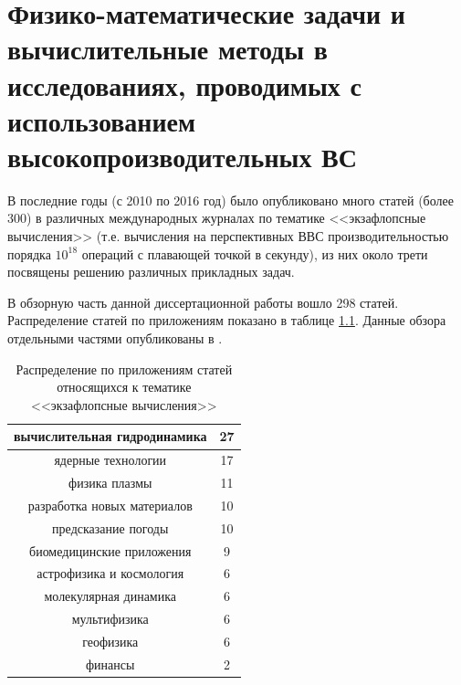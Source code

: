 \chapter{Физико-математические задачи и вычислительные методы в исследованиях, проводимых с использованием высокопроизводительных ВС} \label{chapt2}
В последние годы (с 2010 по 2016 год) было опубликовано много статей (более 300) в различных международных журналах по тематике <<экзафлопсные вычисления>> (т.е. вычисления на перспективных ВВС производительностью порядка $10^{18}$ операций с плавающей точкой в секунду), из них около трети посвящены решению различных прикладных задач.

В обзорную часть данной диссертационной работы вошло 298 статей.  Распределение статей по приложениям показано в таблице \ref{tab_physics}.
Данные обзора отдельными частями опубликованы в \cite{MohographyTarkov,VestnikNNSU,multigridAuto,AutoParSilan,VychMetPlasma,Adaptive,VestnikNSU3D,NumMethMultiLevel,MatMod,VestnikNSUadapt,VychMethProgExa,SuperFrI,adaptCPC,LotovPoP,astroCoDesign,integrApproach}.

\begin{table}[ht]
	\caption{Распределение по приложениям статей относящихся к тематике <<экзафлопсные вычисления>>}
	\begin{center}
		\begin{tabular}{|c|c|}
			\hline
			вычислительная гидродинамика & 27  \\ \hline 
			ядерные технологии & 17       \\ \hline  
			физика плазмы & 11  \\ \hline 
			разработка новых материалов & 10  \\ \hline 
			предсказание погоды & 10 \\ \hline 
			биомедицинские приложения & 9 \\ \hline 
			астрофизика и космология & 6  \\ \hline 
			молекулярная динамика   & 6   \\ \hline 
			мультифизика & 6              \\ \hline 
			геофизика & 6  \\ \hline 
			финансы & 2  \\ \hline 
		\end{tabular}
	\end{center}
	\label{tab_physics}
\end{table}

